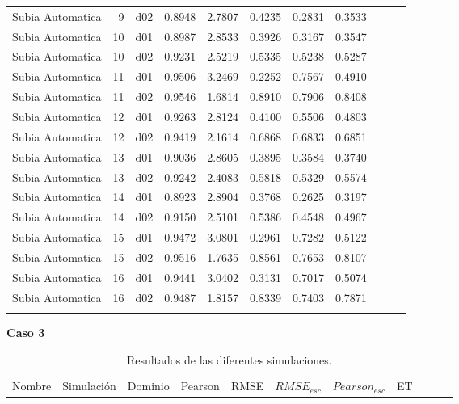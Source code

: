 \begin{landscape}
\begin{longtable}{p{2cm}rrrrrrrrrr}
     Subia Automatica  &          9 &     d02 &   0.8948 &  2.7807 &        0.4235 &           0.2831 &  0.3533 \\
     Subia Automatica  &         10 &     d01 &   0.8987 &  2.8533 &        0.3926 &           0.3167 &  0.3547 \\
     Subia Automatica  &         10 &     d02 &   0.9231 &  2.5219 &        0.5335 &           0.5238 &  0.5287 \\
     Subia Automatica  &         11 &     d01 &   0.9506 &  3.2469 &        0.2252 &           0.7567 &  0.4910 \\
     Subia Automatica  &         11 &     d02 &   0.9546 &  1.6814 &        0.8910 &           0.7906 &  0.8408 \\
     Subia Automatica  &         12 &     d01 &   0.9263 &  2.8124 &        0.4100 &           0.5506 &  0.4803 \\
     Subia Automatica  &         12 &     d02 &   0.9419 &  2.1614 &        0.6868 &           0.6833 &  0.6851 \\
     Subia Automatica  &         13 &     d01 &   0.9036 &  2.8605 &        0.3895 &           0.3584 &  0.3740 \\
     Subia Automatica  &         13 &     d02 &   0.9242 &  2.4083 &        0.5818 &           0.5329 &  0.5574 \\
     Subia Automatica  &         14 &     d01 &   0.8923 &  2.8904 &        0.3768 &           0.2625 &  0.3197 \\
     Subia Automatica  &         14 &     d02 &   0.9150 &  2.5101 &        0.5386 &           0.4548 &  0.4967 \\
     Subia Automatica  &         15 &     d01 &   0.9472 &  3.0801 &        0.2961 &           0.7282 &  0.5122 \\
     Subia Automatica  &         15 &     d02 &   0.9516 &  1.7635 &        0.8561 &           0.7653 &  0.8107 \\
     Subia Automatica  &         16 &     d01 &   0.9441 &  3.0402 &        0.3131 &           0.7017 &  0.5074 \\
     Subia Automatica  &         16 &     d02 &   0.9487 &  1.8157 &        0.8339 &           0.7403 &  0.7871 \\

\label{tab:estaciones_tiempo_caso2}


\end{longtable}

\textbf{Caso 3}

\begin{longtable}{p{2cm}rrrrrrrrrr}
\caption{Resultados de las diferentes simulaciones.}
\label{tab:estaciones_tiempo_wrf}\\
\hline
   Nombre &  Simulación & Dominio &  Pearson &     RMSE &  $RMSE_{esc}$ &    $Pearson_{esc}$ &      ET \\
   

\end{longtable}
\end{landscape}

